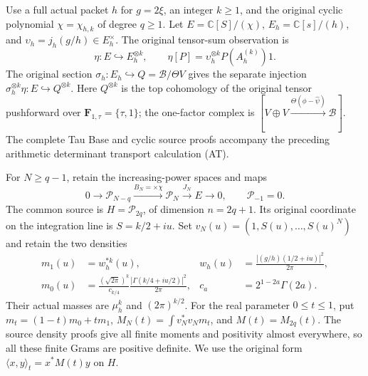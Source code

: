 \documentclass[11pt,a4paper]{article}
\newcommand{\C}{\mathbb C}
\newcommand{\cP}{\mathcal P}
\begin{document}
Use a full actual packet $h$ for $g=2\xi$, an integer $k\ge1$, and the
original cyclic polynomial $\chi=\chi_{h,k}$ of degree $q\ge1$.
Let $E=\C[S]/(\chi)$, $E_h=\C[s]/(h)$, and
$\upsilon_h=j_h(g/h)\in E_h^\times$.
The original tensor-sum observation is
\[
 \eta:E\hookrightarrow E_h^{\otimes k},\qquad
 \eta[P]=\upsilon_h^{\otimes k}P(A_h^{(k)})1.
 \tag{AW1}
\]
The original section $\sigma_h:E_h\hookrightarrow
Q=\mathscr B/\Theta V$ gives the separate injection
$\sigma_h^{\otimes k}\eta:E\hookrightarrow Q^{\otimes k}$.
Here $Q^{\otimes k}$ is the top cohomology of the original tensor
pushforward over $\mathbf F_{1,\tau}=\{\tau,1\}$; the one-factor
complex is $[V\oplus V\xrightarrow{\Theta(\phi-\widehat\psi)}
\mathscr B]$. The complete Tau Base and cyclic source proofs accompany
the preceding arithmetic determinant transport calculation (AT).

For $N\ge q-1$, retain the increasing-power spaces and maps
\[
 0\longrightarrow\cP_{N-q}\xrightarrow{B_N=\times\chi}
 \cP_N\xrightarrow{J_N}E\longrightarrow0,
 \qquad \cP_{-1}=0.
 \tag{AW2}
\]
The common source is $H=\cP_{2q}$, of dimension $n=2q+1$.
Its original coordinate on the integration line is $S=k/2+iu$.
Set $v_N(u)=(1,S(u),\ldots,S(u)^N)$ and retain the two densities
\[
 \begin{aligned}
 m_1(u)&=w_h^{*k}(u),&
 w_h(u)&=\frac{|(g/h)(1/2+iu)|^2}{2\pi},\\
 m_0(u)&=\frac{(\sqrt{2\pi})^k}{c_{k/4}}
              \frac{|\Gamma(k/4+iu/2)|^2}{2\pi},&
 c_a&=2^{1-2a}\Gamma(2a).
 \end{aligned}
 \tag{AW3}
\]
Their actual masses are $\mu_h^k$ and $(2\pi)^{k/2}$.
For the real parameter $0\le t\le1$, put
$m_t=(1-t)m_0+tm_1$, $M_N(t)=\int v_N^*v_Nm_t$, and
$M(t)=M_{2q}(t)$. The source density proofs give all finite moments
and positivity almost everywhere, so all these finite Grams are
positive definite. We use the original form
$\langle x,y\rangle_t=x^*M(t)y$ on $H$.
\end{document}
